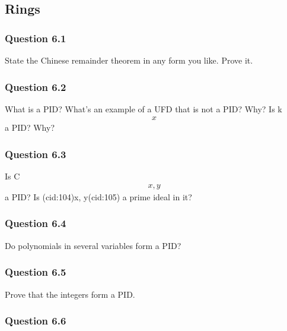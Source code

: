 \hypertarget{rings-1}{%
\subsection{Rings}\label{rings-1}}

\hypertarget{question-6.1}{%
\subsubsection{Question 6.1}\label{question-6.1}}

State the Chinese remainder theorem in any form you like. Prove it.

\hypertarget{question-6.2}{%
\subsubsection{Question 6.2}\label{question-6.2}}

What is a PID? What's an example of a UFD that is not a PID? Why? Is k
\begin{align*}x\end{align*}
a PID? Why?

\hypertarget{question-6.3}{%
\subsubsection{Question 6.3}\label{question-6.3}}

Is C
\begin{align*}x, y\end{align*}
a PID? Is (cid:104)x, y(cid:105) a prime ideal in it?

\hypertarget{question-6.4}{%
\subsubsection{Question 6.4}\label{question-6.4}}

Do polynomials in several variables form a PID?

\hypertarget{question-6.5}{%
\subsubsection{Question 6.5}\label{question-6.5}}

Prove that the integers form a PID.

\hypertarget{question-6.6}{%
\subsubsection{Question 6.6}\label{question-6.6}}

